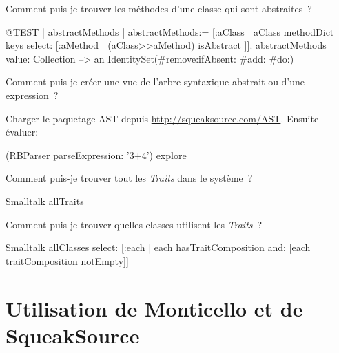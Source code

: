 \documentclass[a4paper,10pt,twoside]{book}
\begin{document}
\begin{faq}
Comment puis-je trouver les méthodes d'une classe qui sont abstraites~?
\end{faq}
\answer
\begin{code}{@TEST | abstractMethods |}
abstractMethods:=
	[:aClass | aClass methodDict keys select:
		[:aMethod | (aClass>>aMethod) isAbstract ]].
abstractMethods value: Collection --> an IdentitySet(#remove:ifAbsent: #add: #do:)
\end{code}

\begin{faq}
Comment puis-je créer une vue de l'arbre syntaxique abstrait ou 
 d'une expression~?
\end{faq}
\answer
Charger le paquetage AST depuis \url{http://squeaksource.com/AST}. Ensuite évaluer:
\begin{code}{}
(RBParser parseExpression: '3+4') explore
\end{code}

\begin{faq}
Comment puis-je trouver tout les \emph{Traits} dans le système~?
\end{faq}
\answer
\begin{code}{}
Smalltalk allTraits
\end{code}

\begin{faq}
Comment puis-je trouver quelles classes utilisent les \emph{Traits}~?
\end{faq}
\answer
\begin{code}{}
Smalltalk allClasses select: [:each | each hasTraitComposition and: [each traitComposition notEmpty]]
\end{code}

\section{Utilisation de Monticello et de SqueakSource}
\end{document}
